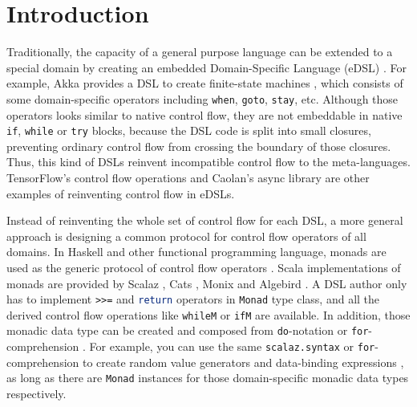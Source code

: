 \maketitle

\section{Introduction}\label{Introduction}

Traditionally, the capacity of a general purpose language can be extended to a special domain by creating an embedded Domain-Specific Language (eDSL) \cite{fowler2010domain} . For example, Akka provides a DSL to create finite-state machines \cite{lightbend2017akka}, which consists of some domain-specific operators including \lstinline{when}, \lstinline{goto}, \lstinline{stay}, etc. Although those operators looks similar to native control flow, they are not embeddable in native \lstinline{if}, \lstinline{while} or \lstinline{try} blocks, because the DSL code is split into small closures, preventing ordinary control flow from crossing the boundary of those closures. Thus, this kind of DSLs reinvent incompatible control flow to the meta-languages. TensorFlow's control flow operations \cite{abadi2016tensorflow} and Caolan's async library \cite{caolan2017async} are other examples of reinventing control flow in eDSLs.

Instead of reinventing the whole set of control flow for each DSL, a more general approach is designing a common protocol for control flow operators of all domains. In Haskell and other functional programming language, monads are used as the generic protocol of control flow operators \cite{wadler1990comprehending,wadler1992essence,jones1993composing}. Scala implementations of monads are provided by Scalaz \cite{kenji2017scalaz}, Cats \cite{typelevel2017cats}, Monix \cite{nedelcu2017monix} and Algebird \cite{twitter2016algebird}. A DSL author only has to implement \lstinline{>>=} and \lstinline[language=Haskell,deletekeywords={return}]{return} operators in \lstinline{Monad} type class, and all the derived control flow operations like \lstinline{whileM} or \lstinline{ifM} are available. In addition, those monadic data type can be created and composed from \lstinline{do}-notation \cite{jones1998haskell} or \lstinline{for}-comprehension \cite{odersky2004scala}. For example, you can use the same \lstinline{scalaz.syntax} or \lstinline{for}-comprehension to create random value generators \cite{nilsson2015scalacheck} and data-binding expressions \cite{yangbo2016binding}, as long as there are \lstinline{Monad} instances for those domain-specific monadic data types respectively.

